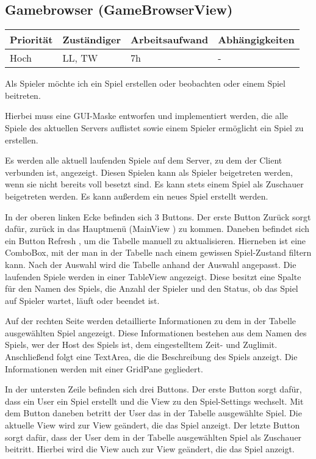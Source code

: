 \documentclass[a4paper]{scrreprt}
\newenvironment{requirement}[5] {
	\subsection{#1}
	\begin{tabularx}{\textwidth}{|X|l|X|X|}
		\hline
		Priorität & Zuständiger & Arbeitsaufwand & Abhängigkeiten \\
		\hline
		#2 & #3 & #4 & #5 \\
		\hline
	\end{tabularx}
	}{
	\newpage
	}
\begin{document}
\begin{requirement}{Gamebrowser (GameBrowserView)}{Hoch}{LL, TW}{7h}{-}

\begin{center}
	Als Spieler möchte ich ein Spiel erstellen oder beobachten oder einem Spiel beitreten.
\end{center}

Hierbei muss eine GUI-Maske entworfen und implementiert werden, die alle Spiele des aktuellen Servers auflistet sowie einem Spieler ermöglicht ein Spiel zu erstellen.

Es werden alle aktuell laufenden Spiele auf dem Server, zu dem der Client verbunden ist, angezeigt. Diesen Spielen kann als Spieler beigetreten werden, wenn sie nicht bereits voll besetzt sind. Es kann stets einem Spiel als Zuschauer beigetreten werden. Es kann außerdem ein neues Spiel erstellt werden.

In der oberen linken Ecke befinden sich 3 Buttons. Der erste Button \glqq Zurück \grqq{} sorgt dafür, zurück in das Hauptmenü (\glqq MainView \grqq{}) zu kommen. 
Daneben befindet sich ein Button \glqq Refresh \grqq{}, um die Tabelle manuell zu aktualisieren.
Hierneben ist eine ComboBox, mit der man in der Tabelle nach einem gewissen Spiel-Zustand filtern kann. Nach der Auswahl wird die Tabelle anhand der Auswahl angepasst.
Die laufenden Spiele werden in einer TableView angezeigt. Diese besitzt eine Spalte für den Namen des Spiels, die Anzahl der Spieler und den Status, ob das Spiel auf Spieler wartet, läuft oder beendet ist.

Auf der rechten Seite werden detaillierte Informationen zu dem in der Tabelle ausgewählten Spiel angezeigt. Diese Informationen bestehen aus dem Namen des Spiels, wer der Host des Spiels ist, dem eingestelltem Zeit- und Zuglimit. Anschließend folgt eine TextArea, die die Beschreibung des Spiels anzeigt.
Die Informationen werden mit einer GridPane gegliedert.

In der untersten Zeile befinden sich drei Buttons. 
Der erste Button sorgt dafür, dass ein User ein Spiel erstellt und die View zu den Spiel-Settings wechselt.
Mit dem Button daneben betritt der User das in der Tabelle ausgewählte Spiel. Die aktuelle View wird zur View geändert, die das Spiel anzeigt.
Der letzte Button sorgt dafür, dass der User dem in der Tabelle ausgewählten Spiel als Zuschauer beitritt. Hierbei wird die View auch zur View geändert, die das Spiel anzeigt.

\end{requirement}
\end{document}
